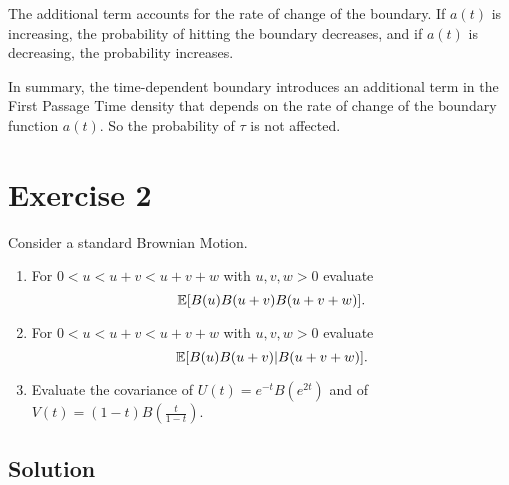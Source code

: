 \documentclass[12pt]{article}
\begin{document}
\begin{enumerate}
		
		The additional term accounts for the rate of change of the boundary. If $a(t)$ is increasing, the probability of hitting the boundary decreases, and if $a(t)$ is decreasing, the probability increases.
		
		In summary, the time-dependent boundary introduces an additional term in the First Passage Time density that depends on the rate of change of the boundary function $a(t)$.
		So the probability of $\tau$ is not affected.
	\end{enumerate} 
	\section*{Exercise 2}
	Consider a standard Brownian Motion.
	
	\begin{enumerate}
		\item For $0 < u < u+v < u+v+w$ with $u,v,w > 0$ evaluate
		\begin{equation*}
			\mathbb{E}[B(u)B(u+v)B(u+v+w)].
		\end{equation*}
		
		\item For $0 < u < u+v < u+v+w$ with $u,v,w > 0$ evaluate
		\begin{equation*}
			\mathbb{E}[B(u)B(u+v)|B(u+v+w)].
		\end{equation*}
		
		\item Evaluate the covariance of $U(t) = e^{-t}B(e^{2t})$ and of $V(t) = (1-t)B(\frac{t}{1-t})$.
	\end{enumerate}
	
	\subsection*{Solution}
	
\end{document}
